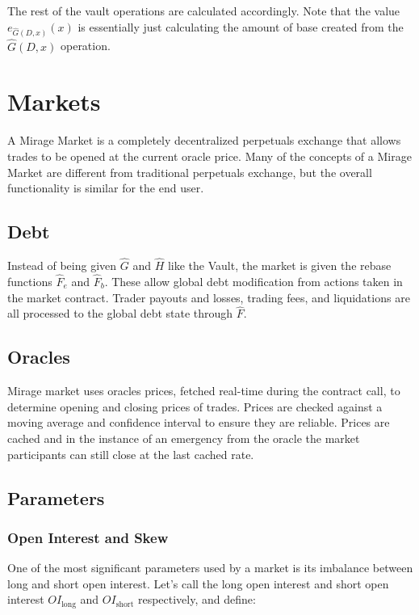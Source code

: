 \documentclass[letterpaper]{article}
\begin{document}
\begin{multicols}{2}
The rest of the vault operations are calculated accordingly. Note that the value $e_{\hat{G}(D, x)}(x)$ is essentially just calculating the amount of base created from the $\hat{G}(D, x)$ operation.

\section{Markets}
\label{sec:mirage-markets}

A Mirage Market is a completely decentralized perpetuals exchange that allows trades to be opened at the current oracle price. Many of the concepts of a Mirage Market are different from traditional perpetuals exchange, but the overall functionality is similar for the end user. 

\subsection{Debt}

Instead of being given $\hat{G}$ and $\hat{H}$ like the Vault, the market is given the rebase functions $\hat{F}_e$ and $\hat{F}_b$. These allow global debt modification from actions taken in the market contract. Trader payouts and losses, trading fees, and liquidations are all processed to the global debt state through $\hat{F}$.

\subsection{Oracles}

Mirage market uses oracles prices, fetched real-time during the contract call, to determine opening and closing prices of trades. Prices are checked against a moving average and confidence interval to ensure they are reliable. Prices are cached and in the instance of an emergency from the oracle the market participants can still close at the last cached rate.

\subsection{Parameters}

\subsubsection{Open Interest and Skew}

One of the most significant parameters used by a market is its imbalance between long and short open interest. Let's call the long open interest and short open interest $OI_{\text{long}}$ and $OI_{\text{short}}$ respectively, and define:


\end{multicols}
\end{document}
